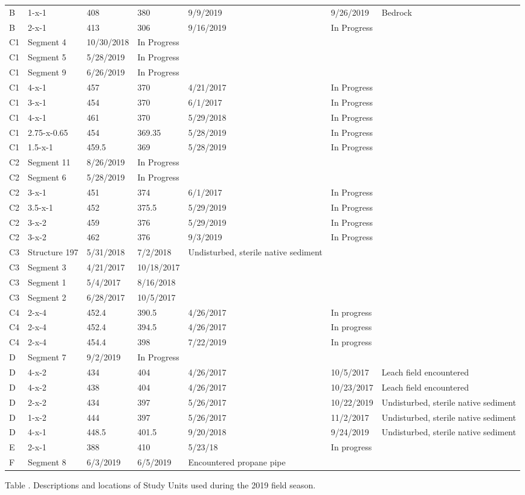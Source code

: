\documentclass[
  12pt,
]{krantz}
\begin{document}
\begin{longtable}[]{@{}lllllll@{}}
B & 1-x-1 & 408 & 380 & 9/9/2019 & 9/26/2019 & Bedrock\tabularnewline
B & 2-x-1 & 413 & 306 & 9/16/2019 & In Progress &\tabularnewline
C1 & Segment 4 & 10/30/2018 & In Progress & & &\tabularnewline
C1 & Segment 5 & 5/28/2019 & In Progress & & &\tabularnewline
C1 & Segment 9 & 6/26/2019 & In Progress & & &\tabularnewline
C1 & 4-x-1 & 457 & 370 & 4/21/2017 & In Progress &\tabularnewline
C1 & 3-x-1 & 454 & 370 & 6/1/2017 & In Progress &\tabularnewline
C1 & 4-x-1 & 461 & 370 & 5/29/2018 & In Progress &\tabularnewline
C1 & 2.75-x-0.65 & 454 & 369.35 & 5/28/2019 & In Progress &\tabularnewline
C1 & 1.5-x-1 & 459.5 & 369 & 5/28/2019 & In Progress &\tabularnewline
C2 & Segment 11 & 8/26/2019 & In Progress & & &\tabularnewline
C2 & Segment 6 & 5/28/2019 & In Progress & & &\tabularnewline
C2 & 3-x-1 & 451 & 374 & 6/1/2017 & In Progress &\tabularnewline
C2 & 3.5-x-1 & 452 & 375.5 & 5/29/2019 & In Progress &\tabularnewline
C2 & 3-x-2 & 459 & 376 & 5/29/2019 & In Progress &\tabularnewline
C2 & 3-x-2 & 462 & 376 & 9/3/2019 & In Progress &\tabularnewline
C3 & Structure 197 & 5/31/2018 & 7/2/2018 & Undisturbed, sterile native sediment & &\tabularnewline
C3 & Segment 3 & 4/21/2017 & 10/18/2017 & & &\tabularnewline
C3 & Segment 1 & 5/4/2017 & 8/16/2018 & & &\tabularnewline
C3 & Segment 2 & 6/28/2017 & 10/5/2017 & & &\tabularnewline
C4 & 2-x-4 & 452.4 & 390.5 & 4/26/2017 & In progress &\tabularnewline
C4 & 2-x-4 & 452.4 & 394.5 & 4/26/2017 & In progress &\tabularnewline
C4 & 2-x-4 & 454.4 & 398 & 7/22/2019 & In progress &\tabularnewline
D & Segment 7 & 9/2/2019 & In Progress & & &\tabularnewline
D & 4-x-2 & 434 & 404 & 4/26/2017 & 10/5/2017 & Leach field encountered\tabularnewline
D & 4-x-2 & 438 & 404 & 4/26/2017 & 10/23/2017 & Leach field encountered\tabularnewline
D & 2-x-2 & 434 & 397 & 5/26/2017 & 10/22/2019 & Undisturbed, sterile native sediment\tabularnewline
D & 1-x-2 & 444 & 397 & 5/26/2017 & 11/2/2017 & Undisturbed, sterile native sediment\tabularnewline
D & 4-x-1 & 448.5 & 401.5 & 9/20/2018 & 9/24/2019 & Undisturbed, sterile native sediment\tabularnewline
E & 2-x-1 & 388 & 410 & 5/23/18 & In progress &\tabularnewline
F & Segment 8 & 6/3/2019 & 6/5/2019 & Encountered propane pipe & &\tabularnewline
\bottomrule
\end{longtable}

Table . Descriptions and locations of Study Units used during the 2019 field season.
\end{document}
